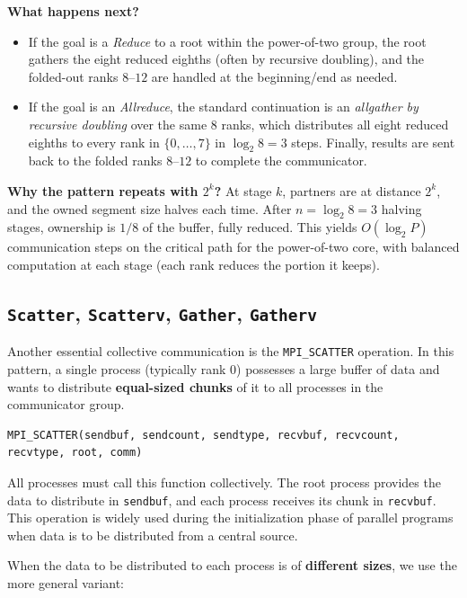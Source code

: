 \documentclass[12pt]{book}
\begin{document}
\noindent
\textbf{What happens next?}
\begin{itemize}
  \item If the goal is a \emph{Reduce} to a root within the power-of-two group, the root gathers the eight reduced eighths
        (often by recursive doubling), and the folded-out ranks \(8\)–\(12\) are handled at the beginning/end as needed.
  \item If the goal is an \emph{Allreduce}, the standard continuation is an \emph{allgather by recursive doubling} over the same \(8\) ranks,
        which distributes all eight reduced eighths to every rank in \(\{0,\ldots,7\}\) in \(\log_2 8=3\) steps.
        Finally, results are sent back to the folded ranks \(8\)–\(12\) to complete the communicator.
\end{itemize}

\noindent
\textbf{Why the pattern repeats with \(2^k\)?}
At stage \(k\), partners are at distance \(2^k\), and the owned segment size halves each time.
After \(n=\log_2 8=3\) halving stages, ownership is \(1/8\) of the buffer, fully reduced.
This yields \(O(\log_2 P)\) communication steps on the critical path for the power-of-two core,
with balanced computation at each stage (each rank reduces the portion it keeps).



\subsection{\texttt{Scatter}, \texttt{Scatterv}, \texttt{Gather}, \texttt{Gatherv}}
Another essential collective communication is the \texttt{MPI\_SCATTER} operation. In this pattern, a single process (typically rank 0) possesses a large buffer of data and wants to distribute \textbf{equal-sized chunks} of it to all processes in the communicator group.

\begin{lstlisting}[style=cppstyle]
MPI_SCATTER(sendbuf, sendcount, sendtype, recvbuf, recvcount, recvtype, root, comm)
\end{lstlisting}


All processes must call this function collectively. The root process provides the data to distribute in \texttt{sendbuf}, and each process receives its chunk in \texttt{recvbuf}. This operation is widely used during the initialization phase of parallel programs when data is to be distributed from a central source.

When the data to be distributed to each process is of \textbf{different sizes}, we use the more general variant:
\end{document}
